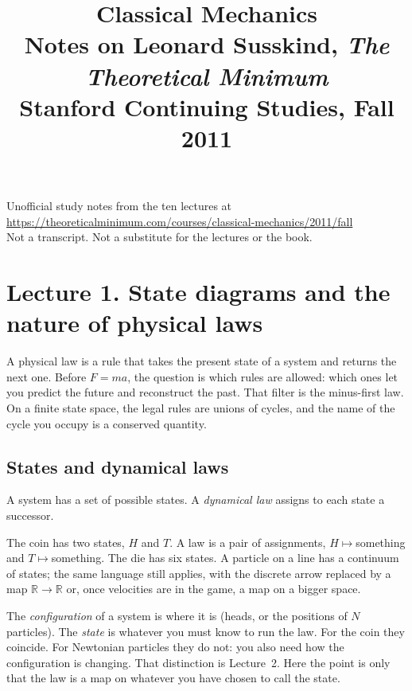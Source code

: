 \documentclass[11pt]{article}
\title{Classical Mechanics\\[0.4em]
\large Notes on Leonard Susskind, \emph{The Theoretical Minimum}\\
Stanford Continuing Studies, Fall 2011}
\author{}
\date{}
\numberwithin{equation}{section}
\begin{document}
\maketitle
\vspace{-2em}
\begin{center}
\small Unofficial study notes from the ten lectures at\\
\url{https://theoreticalminimum.com/courses/classical-mechanics/2011/fall}\\[0.3em]
Not a transcript. Not a substitute for the lectures or the book.
\end{center}

\tableofcontents
\newpage

\section{Lecture 1. State diagrams and the nature of physical laws}

A physical law is a rule that takes the present state of a system and returns the next one. Before $F=ma$, the question is which rules are allowed: which ones let you predict the future and reconstruct the past. That filter is the minus-first law. On a finite state space, the legal rules are unions of cycles, and the name of the cycle you occupy is a conserved quantity.

\subsection{States and dynamical laws}

A system has a set of possible states. A \emph{dynamical law} assigns to each state a successor.

The coin has two states, $H$ and $T$. A law is a pair of assignments, $H\mapsto{}$something and $T\mapsto{}$something. The die has six states. A particle on a line has a continuum of states; the same language still applies, with the discrete arrow replaced by a map $\mathbb{R}\to\mathbb{R}$ or, once velocities are in the game, a map on a bigger space.

The \emph{configuration} of a system is where it is (heads, or the positions of $N$ particles). The \emph{state} is whatever you must know to run the law. For the coin they coincide. For Newtonian particles they do not: you also need how the configuration is changing. That distinction is Lecture~2. Here the point is only that the law is a map on whatever you have chosen to call the state.
\end{document}
